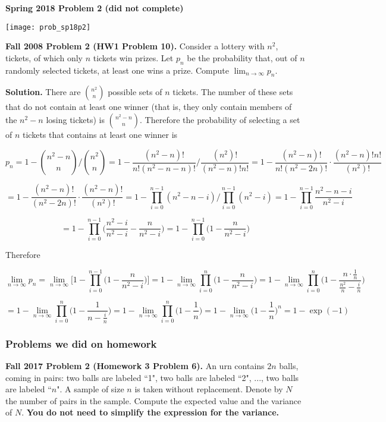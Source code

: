 \textbf{Spring 2018 Problem 2 (did not complete)}

\texttt{[image: prob\_sp18p2]}

\textbf{Fall 2008 Problem 2 (HW1 Problem 10).} Consider a lottery with \(n^2\), tickets, of which only \(n\) tickets win prizes. Let \(p_n\) be the probability that, out of \(n\) randomly selected tickets, at least one wins a prize. Compute \(\lim_{n \to \infty} p_n\).

\textbf{Solution.} There are \(\binom{n^2}{n}\) possible sets of \(n\) tickets. The number of these sets that do not contain at least one winner (that is, they only contain members of the \(n^2 - n\) losing tickets) is \(\binom{n^2 - n}{n}\). Therefore the probability of selecting a set of \(n\) tickets that contains at least one winner is

\[
p_n = 1 - \binom{n^2 - n}{n} \bigg/ \binom{n^2}{n} = 1 - \frac{(n^2 - n)!}{n!(n^2 - n - n)!} \bigg/ \frac{(n^2)!}{(n^2 - n)!n!} = 1 - \frac{(n^2 - n)!}{n!(n^2 - 2n)!} \cdot \frac{(n^2 - n)!n!}{(n^2)!}
\]

\[
 = 1 - \frac{(n^2 - n)!}{(n^2 - 2n)!} \cdot \frac{(n^2 - n)!}{(n^2)!} = 1 - \prod_{i=0}^{n-1}(n^2 - n - i)  \bigg/ \prod_{i=0}^{n-1}(n^2 - i) = 1 - \prod_{i=0}^{n-1} \frac{n^2 - n - i}{n^2 - i}
\]

\[
= 1 - \prod_{i=0}^{n-1}\bigg( \frac{n^2 - i}{n^2 - i} -\frac{n}{n^2 - i} \bigg) = 1 - \prod_{i=0}^{n-1}\bigg(1-\frac{n}{n^2 - i} \bigg)
\]

Therefore

\[
\lim_{n \to \infty} p_n = \lim_{n \to \infty} \bigg[ 1 - \prod_{i=0}^{n-1}\bigg(1-\frac{n}{n^2 - i} \bigg) \bigg] = 1 - \lim_{n \to \infty} \prod_{i=0}^{n}\bigg(1-\frac{n}{n^2 - i} \bigg) = 1 - \lim_{n \to \infty} \prod_{i=0}^{n}\bigg(1-\frac{n \cdot \frac{1}{n}}{\frac{n^2}{n} - \frac{i}{n}} \bigg)
\]

\[
= 1 - \lim_{n \to \infty} \prod_{i=0}^{n}\bigg(1-\frac{1}{n - \frac{i}{n}} \bigg) = 1 - \lim_{n \to \infty} \prod_{i=0}^{n}\bigg(1-\frac{1}{n} \bigg) = 1 - \lim_{n \to \infty}  \bigg(1 - \frac{1}{n} \bigg)^n = \boxed{1 - \exp(-1)}
\]

%
%
%
%
%
%
%
%
%
%

\subsubsection{Problems we did on homework}

\textbf{Fall 2017 Problem 2 (Homework 3 Problem 6).} An urn contains \(2n\) balls, coming in pairs: two balls are labeled ``1", two balls are labeled ``2", ..., two balls are labeled ``\(n\)". A sample of size \(n\) is taken without replacement. Denote by \(N\) the number of pairs in the sample. Compute the expected value and the variance of \(N\). \textbf{You do not need to simplify the expression for the variance.}

